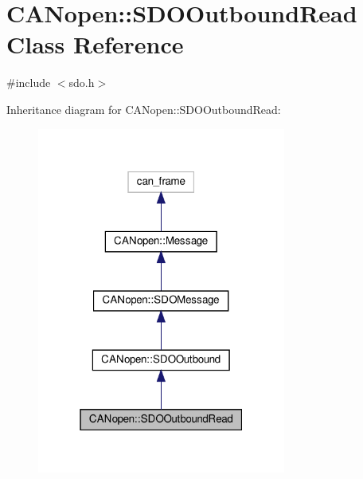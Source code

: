 \hypertarget{class_c_a_nopen_1_1_s_d_o_outbound_read}{}\section{C\+A\+Nopen\+:\+:S\+D\+O\+Outbound\+Read Class Reference}
\label{class_c_a_nopen_1_1_s_d_o_outbound_read}


{\ttfamily \#include $<$sdo.\+h$>$}



Inheritance diagram for C\+A\+Nopen\+:\+:S\+D\+O\+Outbound\+Read\+:\nopagebreak
\begin{figure}[H]
\begin{center}
\leavevmode
\includegraphics[width=232pt]{class_c_a_nopen_1_1_s_d_o_outbound_read__inherit__graph}
\end{center}
\end{figure}


